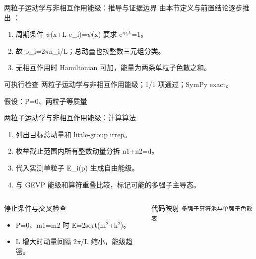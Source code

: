 \begin{frame}[t]{两粒子运动学与非相互作用能级：推导与证据边界}
\footnotesize
{}\quad 由本节定义与前置结论逐步推出 ：
\begin{enumerate}
\item 周期条件 \ensuremath{\psi}(x+L e\_i)=\ensuremath{\psi}(x) 要求 e\ensuremath{^{ip_iL}}=1。
\item 故 p\_i=2\ensuremath{\pi}n\_i/\allowbreak{}L；总动量也按整数三元组分类。
\item 无相互作用时 Hamiltonian 可加，能量为两条单粒子色散之和。
\end{enumerate}\begin{block}{可执行检查}
\quad 两粒子运动学与非相互作用能级；1/1 项通过；SymPy exact。
\par\scriptsize 假设：P=0、两粒子等质量
\end{block}
\end{frame}

\begin{frame}[t]{两粒子运动学与非相互作用能级：计算算法}
\footnotesize
{}\begin{enumerate}
\item 列出目标总动量和 little-group irrep。
\item 枚举截止范围内所有整数动量分拆 n1+n2=d。
\item 代入实测单粒子 E\_i(p) 生成自由能级。
\item 与 GEVP 能级和算符重叠比较，标记可能的多强子主导态。
\end{enumerate}\begin{columns}[T,onlytextwidth]
\begin{block}{停止条件与交叉检查}\scriptsize\begin{itemize}
\item[\CheckMark] P=0、m1=m2 时 E=2sqrt(m\ensuremath{^{2}}+k\ensuremath{^{2}})。
\item[\CheckMark] L 增大时动量间隔 2\ensuremath{\pi}/\allowbreak{}L 缩小，能级趋密。
\end{itemize}\end{block}
\begin{block}{代码映射}
\scriptsize \texttt{多强子算符池与单强子色散表}
\end{block}\end{columns}\end{frame}

